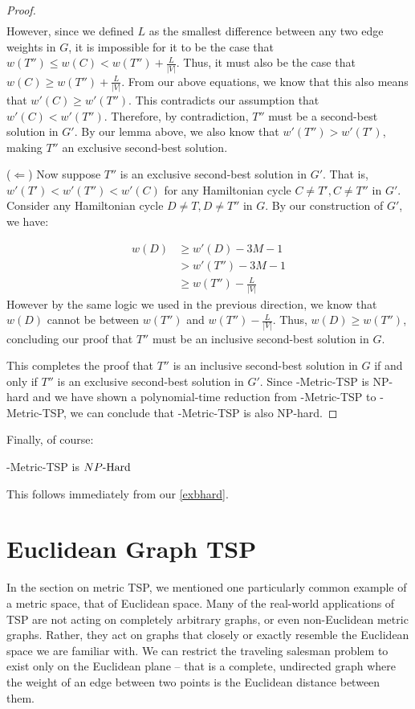 \begin{proof}
\begin{equation*}
\begin{split}
\end{split}
\end{equation*}
However, since we defined $L$ as the smallest difference between any two edge weights in $G$, it is impossible for it to be the case that $w(T'') \leq w(C) <  w(T'') + \frac{L}{|V|}$. Thus, it must also be the case that $w(C) \geq w(T'') + \frac{L}{|V|} $. From our above equations, we know that this also means that $w'(C) \geq w'(T'')$. This contradicts our assumption that $w'(C) < w'(T'')$. Therefore, by contradiction, $T''$ must be a second-best solution in $G'$. By our lemma above, we also know that $w'(T'') > w'(T')$, making $T''$ an exclusive second-best solution. 

($\Leftarrow$) Now suppose $T''$ is an exclusive second-best solution in $G'$. That is, $w'(T') < w'(T'') < w'(C)$ for any Hamiltonian cycle $C \neq T', C \neq T''$ in $G'$. Consider any Hamiltonian cycle $D \neq T,D\neq T''$ in $G$. By our construction of $G'$, we have:

\begin{equation*}
\begin{split}
w(D) &\geq w'(D) - 3M - 1 \\
&> w'(T'') - 3M - 1 \\
&\geq w(T'') - \frac{L}{|V|}
\end{split}
\end{equation*}
However by the same logic we used in the previous direction, we know that $w(D)$ cannot be between $w(T'')$ and $w(T'')-\frac{L}{|V|}$. Thus, $w(D) \geq w(T'')$, concluding our proof that $T''$ must be an inclusive second-best solution in $G$.

This completes the proof that $T''$ is an inclusive second-best solution in $G$ if and only if $T''$ is an exclusive second-best solution in $G'$. Since \inob{}-Metric-TSP is NP-hard and we have shown a polynomial-time reduction from \inob{}-Metric-TSP to \exob{}-Metric-TSP, we can conclude that \exob{}-Metric-TSP is also NP-hard.
\end{proof}

Finally, of course:
\begin{theorem}
    \exb{}-Metric-TSP is ${NP\text{-Hard{}}}$
\end{theorem}
This follows immediately from our \autoref{exbhard}.

\section{Euclidean Graph TSP}
In the section on metric TSP, we mentioned one particularly common example of a metric space, that of Euclidean space. Many of the real-world applications of TSP are not acting on completely arbitrary graphs, or even non-Euclidean metric graphs. Rather, they act on graphs that closely or exactly resemble the Euclidean space we are familiar with. We can restrict the traveling salesman problem to exist only on the Euclidean plane -- that is a complete, undirected graph where the weight of an edge between two points is the Euclidean distance between them. 

